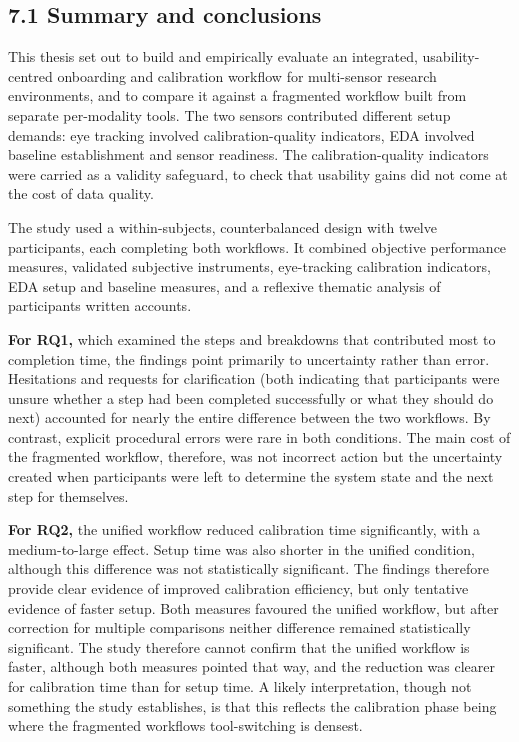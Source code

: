 \documentclass[
]{article}
\begin{document}
\hypertarget{summary-and-conclusions}{%
\subsection{7.1 Summary and conclusions}\label{summary-and-conclusions}}

This thesis set out to build and empirically evaluate an integrated, usability-centred onboarding and calibration workflow for multi-sensor research environments, and to compare it against a fragmented workflow built from separate per-modality tools. The two sensors contributed different setup demands: eye tracking involved calibration-quality indicators, EDA involved baseline establishment and sensor readiness. The calibration-quality indicators were carried as a validity safeguard, to check that usability gains did not come at the cost of data quality.

The study used a within-subjects, counterbalanced design with twelve participants, each completing both workflows. It combined objective performance measures, validated subjective instruments, eye-tracking calibration indicators, EDA setup and baseline measures, and a reflexive thematic analysis of participants\textquotesingle{} written accounts.

\textbf{For RQ1,} which examined the steps and breakdowns that contributed most to completion time, the findings point primarily to uncertainty rather than error. Hesitations and requests for clarification (both indicating that participants were unsure whether a step had been completed successfully or what they should do next) accounted for nearly the entire difference between the two workflows. By contrast, explicit procedural errors were rare in both conditions. The main cost of the fragmented workflow, therefore, was not incorrect action but the uncertainty created when participants were left to determine the system state and the next step for themselves.

\textbf{For RQ2,} the unified workflow reduced calibration time significantly, with a medium-to-large effect. Setup time was also shorter in the unified condition, although this difference was not statistically significant. The findings therefore provide clear evidence of improved calibration efficiency, but only tentative evidence of faster setup. Both measures favoured the unified workflow, but after correction for multiple comparisons neither difference remained statistically significant. The study therefore cannot confirm that the unified workflow is faster, although both measures pointed that way, and the reduction was clearer for calibration time than for setup time. A likely interpretation, though not something the study establishes, is that this reflects the calibration phase being where the fragmented workflow\textquotesingle s tool-switching is densest.
\end{document}
